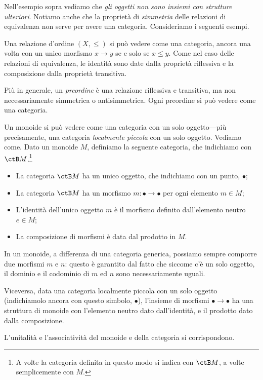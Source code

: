 Nell'esempio sopra vediamo che \emph{gli oggetti non sono insiemi con strutture ulteriori}. 
Notiamo anche che la proprietà di \emph{simmetria} delle relazioni di equivalenza non serve per avere una categoria. Consideriamo i seguenti esempi.

\begin{examples}
 Una relazione d'ordine $(X,\le)$ si può vedere come una categoria, ancora una volta con un unico morfismo $x\to y$ se e solo se $x\le y$. Come nel caso delle relazioni di equivalenza, le identità sono date dalla proprietà riflessiva e la composizione dalla proprietà transitiva. 
 
 Più in generale, un \emph{preordine} è una relazione riflessiva e transitiva, ma non necessariamente simmetrica o antisimmetrica. Ogni preordine si può vedere come una categoria.
\end{examples}


\begin{example}
 Un monoide si può vedere come una categoria con un solo oggetto---più precisamente, una categoria \emph{localmente piccola} con un solo oggetto. 
 Vediamo come. Dato un monoide $M$, definiamo la seguente categoria, che indichiamo con $\ctB M$.\footnote{A volte la categoria definita in questo modo si indica con $\ctB M$, a volte semplicemente con $M$.}
 \begin{itemize}
  \item La categoria $\ctB M$ ha un unico oggetto, che indichiamo con un punto, $\bullet$;
  \item La categoria $\ctB M$ ha un morfismo $m:\bullet\to\bullet$ per ogni elemento $m\in M$;
  \item L'identità dell'unico oggetto $m$ è il morfismo definito dall'elemento neutro $e\in M$;
  \item La composizione di morfismi è data dal prodotto in $M$.
 \end{itemize}
 In un monoide, a differenza di una categoria generica, possiamo sempre comporre due morfismi $m$ e $n$: questo è garantito dal fatto che siccome c'è un solo oggetto, il dominio e il codominio di $m$ ed $n$ sono necessariamente uguali. 
 
 Viceversa, data una categoria localmente piccola con un solo oggetto (indichiamolo ancora con questo simbolo, $\bullet$), l'insieme di morfismi $\bullet\to\bullet$ ha una struttura di monoide con l'elemento neutro dato dall'identità, e il prodotto dato dalla composizione.
 
 L'unitalità e l'associatività del monoide e della categoria si corrispondono.
\end{example}

